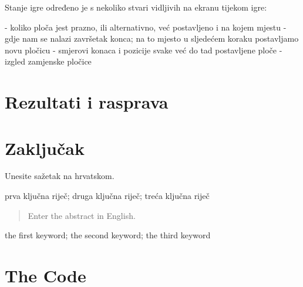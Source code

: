 \documentclass[zavrsnirad]{fer}
\begin{document}
Stanje igre određeno je s nekoliko stvari vidljivih na ekranu tijekom igre: 

- koliko ploča jest prazno, ili alternativno, već postavljeno i na kojem mjestu
- gdje nam se nalazi završetak konca; na to mjesto u sljedećem koraku postavljamo novu pločicu
- smjerovi konaca i pozicije svake već do tad postavljene ploče
- izgled zamjenske pločice

\chapter{Rezultati i rasprava}
\label{pog:rezultati_i_rasprava}

\Blindtext


\chapter{Zaključak}
\label{pog:zakljucak}

\blindtext








\begin{sazetak}
  Unesite sažetak na hrvatskom.

  \blindtext
\end{sazetak}

\begin{kljucnerijeci}
  prva ključna riječ; druga ključna riječ; treća ključna riječ
\end{kljucnerijeci}


\begin{abstract}
  Enter the abstract in English.
  
  \blindtext 
\end{abstract}

\begin{keywords}
  the first keyword; the second keyword; the third keyword
\end{keywords}



\backmatter

\chapter{The Code}

\Blindtext
\end{document}
